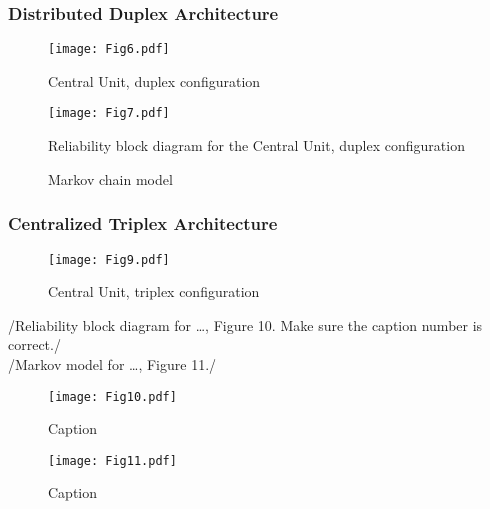 \subsubsection{Distributed Duplex Architecture}
\begin{figure}[H]
  \centering
  \texttt{[image: Fig6.pdf]}
  \caption{Central Unit, duplex configuration }
  \label{fig6}
\end{figure}
\begin{figure}[H]
  \centering
  \texttt{[image: Fig7.pdf]}
  \caption{Reliability block diagram for the Central Unit, duplex configuration}
  \label{fig7}
\end{figure}
\begin{figure}[h!]
\begin{center}
\caption{Markov chain model}
\end{center}
\end{figure}
\subsubsection{Centralized Triplex Architecture}

\begin{figure}[H]
  \centering
  \texttt{[image: Fig9.pdf]}
  \caption{Central Unit, triplex configuration }
  \label{fig9}
\end{figure}
/{Reliability block diagram for …, Figure 10.  Make sure the caption number is correct.}/
\\/{Markov model for …, Figure 11.}/

\begin{figure}[H]
  \centering
  \texttt{[image: Fig10.pdf]}
  \caption{Caption }
  \label{fig10}
\end{figure}
\begin{figure}[H]
  \centering
  \texttt{[image: Fig11.pdf]}
  \caption{Caption}
  \label{fig11}
\end{figure}
